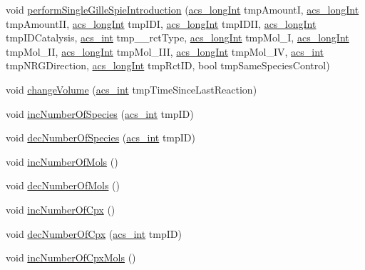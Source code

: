 \begin{DoxyCompactItemize}
void \hyperlink{a00014_a30a0827eed2860d03d5fa5318fcf86b0}{perform\-Single\-Gille\-Spie\-Introduction} (\hyperlink{a00072_a19319d75f02db4308bc5c0026d98cd85}{acs\-\_\-long\-Int} tmp\-Amount\-I, \hyperlink{a00072_a19319d75f02db4308bc5c0026d98cd85}{acs\-\_\-long\-Int} tmp\-Amount\-I\-I, \hyperlink{a00072_a19319d75f02db4308bc5c0026d98cd85}{acs\-\_\-long\-Int} tmp\-I\-D\-I, \hyperlink{a00072_a19319d75f02db4308bc5c0026d98cd85}{acs\-\_\-long\-Int} tmp\-I\-D\-I\-I, \hyperlink{a00072_a19319d75f02db4308bc5c0026d98cd85}{acs\-\_\-long\-Int} tmp\-I\-D\-Catalysis, \hyperlink{a00072_a8d277355641a098190360234e2ebde35}{acs\-\_\-int} tmp\-\_\-\-\_\-rct\-Type, \hyperlink{a00072_a19319d75f02db4308bc5c0026d98cd85}{acs\-\_\-long\-Int} tmp\-Mol\-\_\-\-I, \hyperlink{a00072_a19319d75f02db4308bc5c0026d98cd85}{acs\-\_\-long\-Int} tmp\-Mol\-\_\-\-I\-I, \hyperlink{a00072_a19319d75f02db4308bc5c0026d98cd85}{acs\-\_\-long\-Int} tmp\-Mol\-\_\-\-I\-I\-I, \hyperlink{a00072_a19319d75f02db4308bc5c0026d98cd85}{acs\-\_\-long\-Int} tmp\-Mol\-\_\-\-I\-V, \hyperlink{a00072_a8d277355641a098190360234e2ebde35}{acs\-\_\-int} tmp\-N\-R\-G\-Direction, \hyperlink{a00072_a19319d75f02db4308bc5c0026d98cd85}{acs\-\_\-long\-Int} tmp\-Rct\-I\-D, bool tmp\-Same\-Species\-Control)
\item 
void \hyperlink{a00014_a0156a2d7219396e58a930731966b0c66}{change\-Volume} (\hyperlink{a00072_a8d277355641a098190360234e2ebde35}{acs\-\_\-int} tmp\-Time\-Since\-Last\-Reaction)
\item 
void \hyperlink{a00014_a9fdf3a3b16809edd87c1b1963ef0a67f}{inc\-Number\-Of\-Species} (\hyperlink{a00072_a8d277355641a098190360234e2ebde35}{acs\-\_\-int} tmp\-I\-D)
\item 
void \hyperlink{a00014_a69a926e0b9bb4f4b29876d0e45b54d84}{dec\-Number\-Of\-Species} (\hyperlink{a00072_a8d277355641a098190360234e2ebde35}{acs\-\_\-int} tmp\-I\-D)
\item 
void \hyperlink{a00014_ae356db3b6ee374b998e9f041216b4b75}{inc\-Number\-Of\-Mols} ()
\item 
void \hyperlink{a00014_af042f7904c92fdd239995bebbab2cf60}{dec\-Number\-Of\-Mols} ()
\item 
void \hyperlink{a00014_a69ae530ef6f9298e3ab8304157709404}{inc\-Number\-Of\-Cpx} ()
\item 
void \hyperlink{a00014_aadd057e7038269e6fac314a12a3bf334}{dec\-Number\-Of\-Cpx} (\hyperlink{a00072_a8d277355641a098190360234e2ebde35}{acs\-\_\-int} tmp\-I\-D)
\item 
void \hyperlink{a00014_ab101d2158575829ddfe846087040f2fa}{inc\-Number\-Of\-Cpx\-Mols} ()

\end{DoxyCompactItemize}
